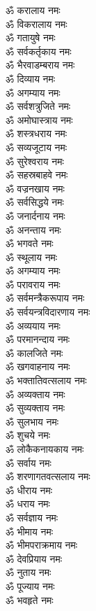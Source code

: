 \begin{multicols}{2}
\begin{flushleft}
ॐ करालाय नमः\\
ॐ विकरालाय नमः\\
ॐ गतायुषे नमः\\
ॐ सर्वकर्तृकाय नमः\\
ॐ भैरवाडम्बराय नमः\\
ॐ दिव्याय नमः\\
ॐ अगम्याय नमः\\
ॐ सर्वशत्रुजिते नमः\\
ॐ अमोघास्त्राय नमः\\
ॐ शस्त्रधराय नमः\hfill{}\\
ॐ सव्यजूटाय नमः\\
ॐ सुरेश्वराय नमः\\
ॐ सहस्रबाहवे नमः\\
ॐ वज्रनखाय नमः\\
ॐ सर्वसिद्धये नमः\\
ॐ जनार्दनाय नमः\\
ॐ अनन्ताय नमः\\
ॐ भगवते नमः\\
ॐ स्थूलाय नमः\\
ॐ अगम्याय नमः\hfill{}\\
ॐ परावराय नमः\\
ॐ सर्वमन्त्रैकरूपाय नमः\\
ॐ सर्वयन्त्रविदारणाय नमः\\
ॐ अव्ययाय नमः\\
ॐ परमानन्दाय नमः\\
ॐ कालजिते नमः\\
ॐ खगवाहनाय नमः\\
ॐ भक्तातिवत्सलाय नमः\\
ॐ अव्यक्ताय नमः\\
ॐ सुव्यक्ताय नमः\hfill{}\\
ॐ सुलभाय नमः\\
ॐ शुचये नमः\\
ॐ लोकैकनायकाय नमः\\
ॐ सर्वाय नमः\\
ॐ शरणागतवत्सलाय नमः\\
ॐ धीराय नमः\\
ॐ धराय नमः\\
ॐ सर्वज्ञाय नमः\\
ॐ भीमाय नमः\\
ॐ भीमपराक्रमाय नमः\hfill{}\\
ॐ देवप्रियाय नमः\\
ॐ नुताय नमः\\
ॐ पूज्याय नमः\\
ॐ भवहृते नमः\\

\end{flushleft}
\end{multicols}
